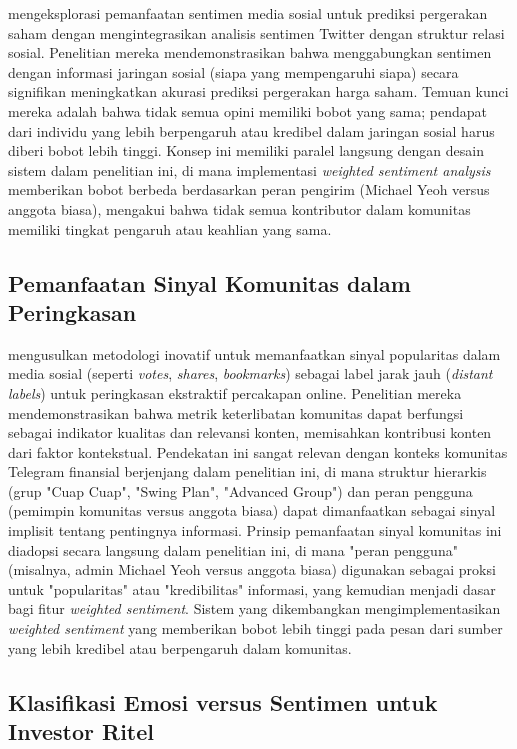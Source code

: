 \textcite{si2014} mengeksplorasi pemanfaatan sentimen media sosial untuk prediksi pergerakan saham dengan mengintegrasikan analisis sentimen Twitter dengan struktur relasi sosial. Penelitian mereka mendemonstrasikan bahwa menggabungkan sentimen dengan informasi jaringan sosial (siapa yang mempengaruhi siapa) secara signifikan meningkatkan akurasi prediksi pergerakan harga saham. Temuan kunci mereka adalah bahwa tidak semua opini memiliki bobot yang sama; pendapat dari individu yang lebih berpengaruh atau kredibel dalam jaringan sosial harus diberi bobot lebih tinggi. Konsep ini memiliki paralel langsung dengan desain sistem dalam penelitian ini, di mana implementasi \textit{weighted sentiment analysis} memberikan bobot berbeda berdasarkan peran pengirim (Michael Yeoh versus anggota biasa), mengakui bahwa tidak semua kontributor dalam komunitas memiliki tingkat pengaruh atau keahlian yang sama.

\subsection{Pemanfaatan Sinyal Komunitas dalam Peringkasan}

\textcite{kano2018} mengusulkan metodologi inovatif untuk memanfaatkan sinyal popularitas dalam media sosial (seperti \textit{votes}, \textit{shares}, \textit{bookmarks}) sebagai label jarak jauh (\textit{distant labels}) untuk peringkasan ekstraktif percakapan online. Penelitian mereka mendemonstrasikan bahwa metrik keterlibatan komunitas dapat berfungsi sebagai indikator kualitas dan relevansi konten, memisahkan kontribusi konten dari faktor kontekstual. Pendekatan ini sangat relevan dengan konteks komunitas Telegram finansial berjenjang dalam penelitian ini, di mana struktur hierarkis (grup "Cuap Cuap", "Swing Plan", "Advanced Group") dan peran pengguna (pemimpin komunitas versus anggota biasa) dapat dimanfaatkan sebagai sinyal implisit tentang pentingnya informasi. Prinsip pemanfaatan sinyal komunitas ini diadopsi secara langsung dalam penelitian ini, di mana "peran pengguna" (misalnya, admin Michael Yeoh versus anggota biasa) digunakan sebagai proksi untuk "popularitas" atau "kredibilitas" informasi, yang kemudian menjadi dasar bagi fitur \textit{weighted sentiment}. Sistem yang dikembangkan mengimplementasikan \textit{weighted sentiment} yang memberikan bobot lebih tinggi pada pesan dari sumber yang lebih kredibel atau berpengaruh dalam komunitas.

\subsection{Klasifikasi Emosi versus Sentimen untuk Investor Ritel}

